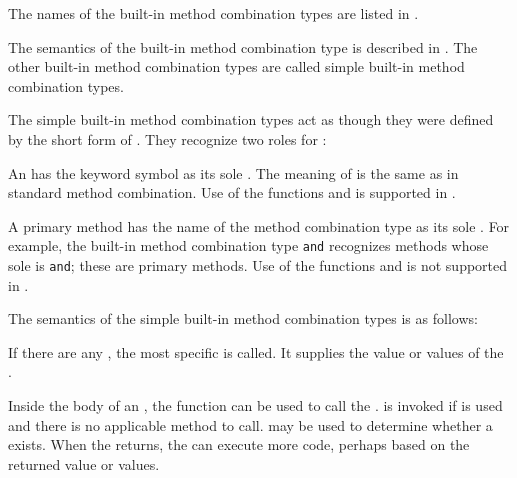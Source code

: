 The names of the built-in  method combination types are listed in \thenextfigure.
\logidx{+}%
%
%
%
%
%
%
%
%


The semantics of the  built-in method combination type is
described in \secref\StdMethComb.  The other
built-in method combination types are called simple built-in method
combination types.

The simple built-in method combination types act as though they were
defined by the short form of .  
They recognize two roles for :

\beginlist
                                                                  
\itemitem{\bull} An  has the keyword symbol 
 as its sole .  The meaning of 
  is the same as in standard method combination.
Use of the functions  and 
is supported in .

\itemitem{\bull} A primary method has the name of the method combination
type as its sole .  For example, the built-in method
combination type {\tt and} recognizes methods whose sole  is
{\tt and}; these are primary methods. Use of the functions 
 and  is not supported 
in .

\endlist

The semantics of the simple built-in method combination types is as
follows:

\beginlist
\itemitem{\bull}                                                    
If there are any , the most specific 
is called.   It supplies the value or values of the . 
                                    
\itemitem{\bull} Inside the body of an , the function
 can be used to call the .
 is invoked if 
 is used and there is no applicable method to call.
 may be used to determine whether a
 exists. When the  returns, 
the  can execute more code,
perhaps based on the returned value or values.
                    

